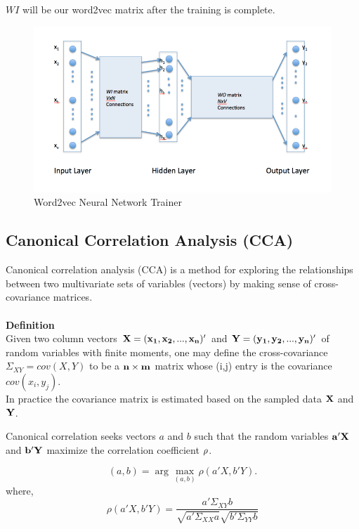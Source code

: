 \documentclass{article} %
\begin{document}
	$WI$ will be our word2vec matrix after the training is complete.
	
	\begin{figure}[H]
		\begin{center}
			\includegraphics[scale = 0.6]{Figures/word2vecNN.png}
			\caption{Word2vec Neural Network Trainer}
			\label{fig:word2vecNN}
		\end{center}
	\end{figure}
	
	\subsection{Canonical Correlation Analysis (CCA)}
	
	Canonical correlation analysis (CCA) is a method for exploring the relationships between two multivariate sets of variables (vectors) by making sense of cross-covariance matrices.
	\\\\
	{\bf Definition}\\
	Given two column vectors $\bf{{X} = (x_1, x_2,..., x_n)'}$ and  $\bf{{Y} = (y_1, y_2,..., y_n)'}$ of random variables with finite moments, one may define the cross-covariance ${\Sigma_{XY}} = cov({X},{Y})$ to be a ${{\bf n}\times{\bf m}}$ matrix whose (i,j) entry is the covariance $cov(x_i,y_j)$.\\
	In practice the covariance matrix is estimated based on the sampled data $\bf{X}$ and $\bf{Y}$.\cite{ccadefn}
	
	
	Canonical correlation seeks vectors ${a}$ and ${b}$ such that the random variables $\bf{a'X}$ and $\bf{b'Y}$ maximize the correlation coefficient ${\bf \rho}$.
	
	\begin{equation}
	(a,b) = \arg \max_{(a,b)} {\rho}({a'X},{b'Y}).
	\end{equation}
	where,
	\begin{equation}	
	\rho({a'X},{b'Y}) = \frac{a' \Sigma_{XY} b}{\sqrt{a'\Sigma_{XX}a}\sqrt{b'\Sigma_{YY}b}}	
	\end{equation}
	
\end{document}
